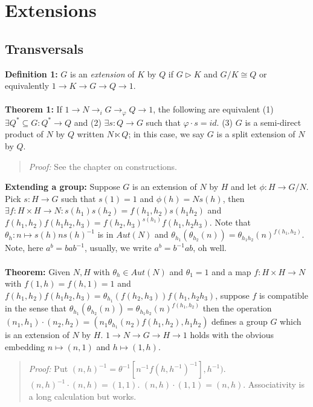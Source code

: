 \chapter{Extensions}
\section {Transversals} 
{\bf Definition 1:}
$G$ is an \emph{extension} of $K$ by $Q$ if $G \triangleright K$ and $G/K \cong Q$
or equivalently $1 \rightarrow K \rightarrow G \rightarrow Q \rightarrow 1$.
\\
\\
{\bf Theorem 1:}
If $1 \rightarrow N \rightarrow_{i} G \rightarrow_{\varphi} Q \rightarrow 1$, the following
are equivalent
(1) $\exists Q^* \subseteq G: Q^* \rightarrow Q$ and
(2) $\exists s:Q \rightarrow G$ such that $\varphi \cdot s = id$.
(3) $G$ is a semi-direct product of $N$ by $Q$ written $N \ltimes Q$; in this
case, we say $G$ is a split extension of $N$ by $Q$.
\begin{quote}
\emph{Proof:}  See the chapter on constructions.
\end{quote}
{\bf Extending a group:}
Suppose $G$ is an extension of $N$ by $H$ and let $\phi: H \rightarrow G/N$.  Pick
$s:H \rightarrow G$ such that $s(1)=1$ and $\phi(h) = N s(h)$, then 
$\exists f: H \times H \rightarrow N: s(h_1) s(h_2)= f(h_1, h_2) s(h_1 h_2)$
and $f(h_1, h_2) f(h_1 h_2, h_3)= f(h_2, h_3)^{s(h_1)} f(h_1 , h_2 h_3)$.  Note
that $\theta_h: n \mapsto s(h) n s(h)^{-1}$ is in $Aut(N)$ and
$\theta_{h_1}(\theta_{h_2}(n))= \theta_{h_1 h_2}(n)^{f(h_1, h_2)}$.  Note, here $a^b = b a b^{-1}$, usually,
we write $a^b = b ^ {-1} a b$, oh well.
\\
\\
{\bf Theorem:}
Given $N,H$ with $\theta_h \in Aut(N)$ and $\theta_1 = 1$ and a map
$f: H \times H \rightarrow N$ with $f(1,h)=f(h,1)=1$ and
$f(h_1, h_2) f(h_1 h_2 , h_3)= \theta_{h_1}(f(h_2, h_3)) f(h_1, h_2 h_3)$, 
suppose $f$ is compatible in the sense that 
$\theta_{h_1}(\theta_{h_2}(n))= \theta_{h_1h_2}(n)^{f(h_1, h_2)}$ then the
operation $(n_1, h_1) \cdot (n_2, h_2) = (n_1 \theta_{h_1}(n_2) f(h_1, h_2), h_1 h_2)$
defines a group $G$ which is an extension of $N$ by $H$.  
$1 \rightarrow N \rightarrow G \rightarrow H \rightarrow 1$ holds with the obvious
embedding $n \mapsto (n,1)$ and $h \mapsto (1,h)$.
\begin{quote}
\emph{Proof:}  Put $(n,h)^{-1}= \theta^{-1}[n^{-1} f(h,h^{-1})^{-1}], h^{-1})$.
$(n,h)^{-1} \cdot (n,h)= (1,1)$.   $(n,h) \cdot (1,1)= (n,h)$.  Associativity is a long
calculation but works.
\end{quote}
